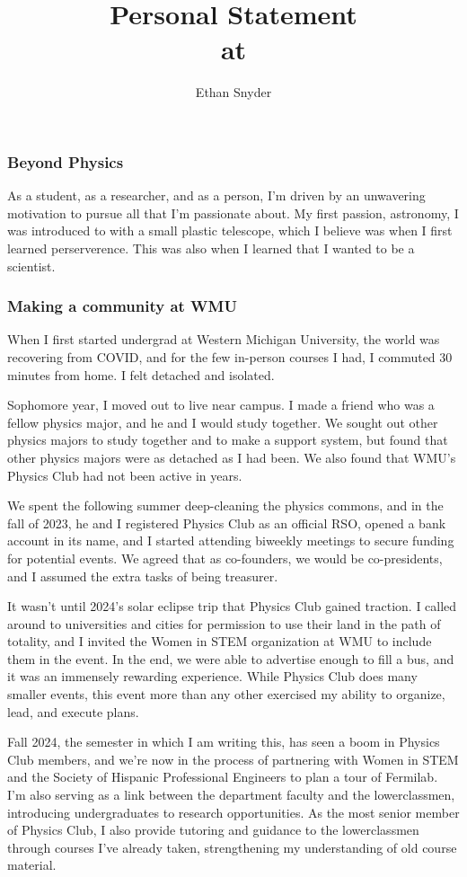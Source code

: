 \documentclass[11pt]{article}
\title{Personal Statement\\
	\large \dept{} at \school{}}
\author{Ethan Snyder}
\date{}
\begin{document}
\maketitle
\subsubsection*{Beyond Physics}
As a student, as a researcher, and as a person, I'm driven by an unwavering motivation to pursue all that I'm passionate about. My first passion, astronomy, I was introduced to with a small plastic telescope, which I believe was when I first learned perserverence. This was also when I learned that I wanted to be a scientist.

\subsubsection*{Making a community at WMU}
When I first started undergrad at Western Michigan University, the world was recovering from COVID, and for the few in-person courses I had, I commuted 30 minutes from home. I felt detached and isolated.

Sophomore year, I moved out to live near campus. I made a friend who was a fellow physics major, and he and I would study together. We sought out other physics majors to study together and to make a support system, but found that other physics majors were as detached as I had been. We also found that WMU's Physics Club had not been active in years.

We spent the following summer deep-cleaning the physics commons, and in the fall of 2023, he and I registered Physics Club as an official RSO, opened a bank account in its name, and I started attending biweekly meetings to secure funding for potential events. We agreed that as co-founders, we would be co-presidents, and I assumed the extra tasks of being treasurer.

It wasn't until 2024's solar eclipse trip that Physics Club gained traction. I called around to universities and cities for permission to use their land in the path of totality, and I invited the Women in STEM organization at WMU to include them in the event. In the end, we were able to advertise enough to fill a bus, and it was an immensely rewarding experience. While Physics Club does many smaller events, this event more than any other exercised my ability to organize, lead, and execute plans.

Fall 2024, the semester in which I am writing this, has seen a boom in Physics Club members, and we're now in the process of partnering with Women in STEM and the Society of Hispanic Professional Engineers to plan a tour of Fermilab. I'm also serving as a link between the department faculty and the lowerclassmen, introducing undergraduates to research opportunities. As the most senior member of Physics Club, I also provide tutoring and guidance to the lowerclassmen through courses I've already taken, strengthening my understanding of old course material.
\end{document}

